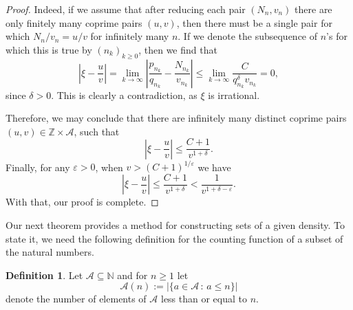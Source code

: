 \documentclass[reqno]{amsart}
\theoremstyle{definition}
\newtheorem{definition}{Definition}
\begin{document}
\begin{proof}
Indeed, if we assume that after reducing each pair $(N_{n},v_{n})$ there are only finitely many coprime pairs $(u,v)$, then there must be a single pair for which $N_{n}/v_{n} = u/v$ for infinitely many $n$.  If we denote the subsequence of $n$'s for which this is true by $(n_{k})_{k\geq 0}$, then we find that
\begin{equation*}
    \left\vert \xi -\frac{u}{v} \right\vert = \lim_{k\to\infty}\left\vert \frac{p_{n_{k}}}{q_{n_{k}}} -\frac{N_{n_k}}{v_{n_k}} \right\vert \leq \lim_{k\to\infty}\frac{C}{q_{n_k}^{\delta} v_{n_k}} = 0,
\end{equation*}
since $\delta > 0$.  This is clearly a contradiction, as $\xi$ is irrational.

Therefore, we may conclude that there are infinitely many distinct coprime pairs $(u,v) \in \mathbb{Z} \times \mathcal{A}$, such that
\begin{equation*}
    \left\vert \xi - \frac{u}{v} \right\vert \leq \frac{C+1}{v^{1+\delta}}.
\end{equation*}
Finally, for any $\varepsilon > 0$, when $v > (C+1)^{1/\varepsilon}$ we have 
\begin{equation*}
    \left\vert \xi - \frac{u}{v} \right\vert \leq \frac{C+1}{v^{1+\delta}} < \frac{1}{v^{1+\delta - \varepsilon}}.
\end{equation*}
With that, our proof is complete.
\end{proof}

Our next theorem provides a method for constructing sets of a given density.  To state it, we need the following definition for the counting function of a subset of the natural numbers.

\begin{definition}
    Let $\mathcal{A} \subseteq \mathbb{N}$ and for $n \geq 1$ let
    \begin{equation*}
        \mathcal{A}(n) := \vert \{a \in \mathcal{A} \, : \, a \leq n\} \vert
    \end{equation*}
    denote the number of elements of $\mathcal{A}$ less than or equal to $n$.
\end{definition}
\end{document}
